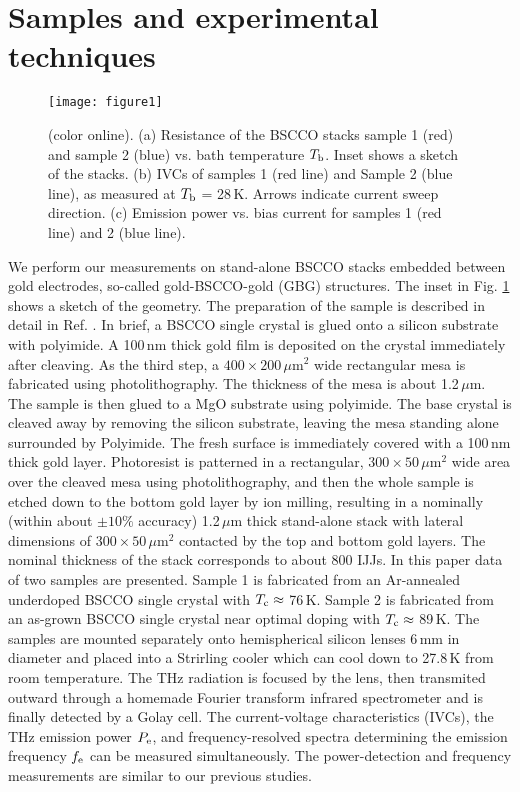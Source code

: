 \documentclass[aps,twocolumn,prb,showpacs,preprintnumbers,superscriptaddress,amsmath,amssymb,longbibliography]{revtex4-1}
\begin{document}
\section{Samples and experimental techniques}
\label{sec:samples}

\begin{figure}[tb]
\texttt{[image: figure1]}
\caption{(color online). (a) Resistance of the BSCCO stacks sample 1 (red) and sample 2 (blue) vs. bath temperature $T_{\rm b}$. Inset shows a sketch of the stacks. (b) IVCs of samples 1 (red line) and Sample 2 (blue line), as measured at $T_{\rm b}$ = 28\,K. Arrows indicate current sweep direction. (c) Emission power vs. bias current for samples 1 (red line) and 2 (blue line). }
\label{fig:Sketch}
\end{figure}
%
We perform our measurements on stand-alone BSCCO stacks embedded between gold electrodes, so-called gold-BSCCO-gold (GBG) structures. The inset in Fig. \ref{fig:Sketch} shows a sketch of the geometry. The preparation of the sample is described in detail in Ref. . In brief, a BSCCO single crystal is glued onto a silicon substrate with polyimide. A 100\,nm thick gold film is deposited on the crystal immediately after cleaving. As the third step, a $400\times 200$\,$\mu$m$^2$ wide rectangular mesa is fabricated using photolithography. The thickness of the mesa is about 1.2\,$\mu$m. The sample is then glued to a MgO substrate using polyimide. The base crystal is cleaved away by removing the silicon substrate, leaving the mesa standing alone surrounded by Polyimide. The fresh surface is immediately covered with a 100\,nm thick gold layer. Photoresist is patterned in a rectangular, $300\times50$\,$\mu$m$^2$ wide area over the cleaved mesa using photolithography, and then the whole sample is etched down to the bottom gold layer by ion milling, resulting in a nominally (within about $\pm 10\%$ accuracy) 1.2\,$\mu$m thick stand-alone stack with lateral dimensions of $300\times50$\,$\mu$m$^2$ contacted by the top and bottom gold layers. The nominal thickness of the stack corresponds to about 800 IJJs.
In this paper data of two samples are presented. Sample 1 is fabricated from an Ar-annealed underdoped BSCCO single crystal with $T_{\rm c} \approx$ 76\,K. Sample 2 is fabricated from an as-grown BSCCO single crystal near optimal doping with $T_{\rm c} \approx$ 89\,K. 
The samples are mounted separately onto hemispherical silicon lenses 6\,mm in diameter and placed into a Strirling cooler which can cool down to 27.8\,K from room temperature. The THz radiation is focused by the lens, then transmited outward through a homemade Fourier transform infrared spectrometer and is finally detected by a Golay cell. The current-voltage characteristics (IVCs), the THz emission power $P_{\rm e}$, and frequency-resolved spectra determining the emission frequency $f_{\rm e}$ can be measured simultaneously. The power-detection and frequency measurements are similar to our previous studies\cite{Guenon10}.
\end{document}
